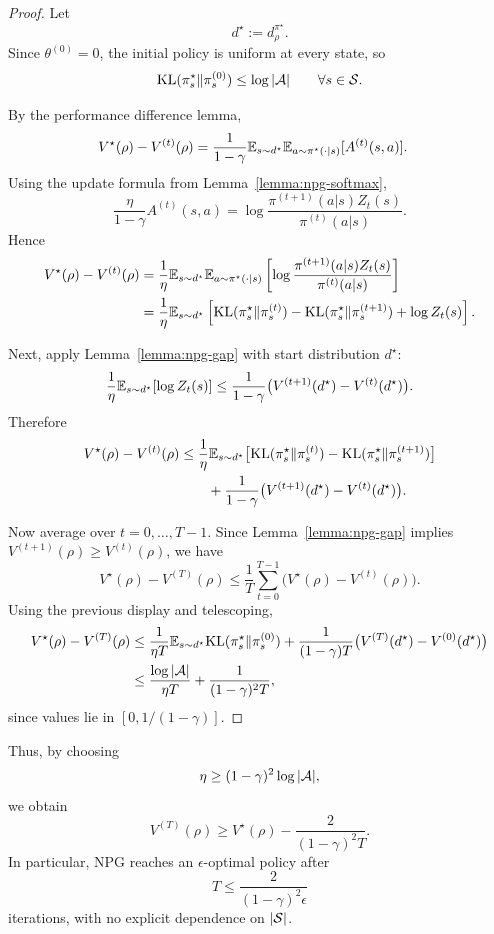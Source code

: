 \begin{proof}
Let
\[
d^\star := d_\rho^{\pi^\star}.
\]
Since $\theta^{(0)}=0$, the initial policy is uniform at every state, so
\[
\mathrm{KL}(\pi_s^\star\|\pi_s^{(0)})\le \log |\mathcal{A}|
\qquad \forall s\in\mathcal{S}.
\]

By the performance difference lemma,
\begin{align*}
V^\star(\rho)-V^{(t)}(\rho)
&=
\frac{1}{1-\gamma}
\mathbb{E}_{s\sim d^\star}
\mathbb{E}_{a\sim \pi^\star(\cdot|s)}[A^{(t)}(s,a)].
\end{align*}
Using the update formula from Lemma~\ref{lemma:npg-softmax},
\[
\frac{\eta}{1-\gamma}A^{(t)}(s,a)
=
\log \frac{\pi^{(t+1)}(a|s)Z_t(s)}{\pi^{(t)}(a|s)}.
\]
Hence
\begin{align*}
V^\star(\rho)-V^{(t)}(\rho)
&=
\frac{1}{\eta}
\mathbb{E}_{s\sim d^\star}
\mathbb{E}_{a\sim \pi^\star(\cdot|s)}
\left[
\log \frac{\pi^{(t+1)}(a|s)Z_t(s)}{\pi^{(t)}(a|s)}
\right] \\
&=
\frac{1}{\eta}
\mathbb{E}_{s\sim d^\star}
\left[
\mathrm{KL}(\pi_s^\star\|\pi_s^{(t)})
-
\mathrm{KL}(\pi_s^\star\|\pi_s^{(t+1)})
+
\log Z_t(s)
\right].
\end{align*}

Next, apply Lemma~\ref{lemma:npg-gap} with start distribution $d^\star$:
\[
\frac{1}{\eta}\mathbb{E}_{s\sim d^\star}[\log Z_t(s)]
\le
\frac{1}{1-\gamma}\big(V^{(t+1)}(d^\star)-V^{(t)}(d^\star)\big).
\]
Therefore
\begin{align*}
V^\star(\rho)-V^{(t)}(\rho)
&\le
\frac{1}{\eta}
\mathbb{E}_{s\sim d^\star}
\big[
\mathrm{KL}(\pi_s^\star\|\pi_s^{(t)})
-
\mathrm{KL}(\pi_s^\star\|\pi_s^{(t+1)})
\big] \\
&\qquad +
\frac{1}{1-\gamma}\big(V^{(t+1)}(d^\star)-V^{(t)}(d^\star)\big).
\end{align*}

Now average over $t=0,\ldots,T-1$.
Since Lemma~\ref{lemma:npg-gap} implies $V^{(t+1)}(\rho)\ge V^{(t)}(\rho)$, we have
\[
V^\star(\rho)-V^{(T)}(\rho)
\le
\frac{1}{T}\sum_{t=0}^{T-1}\big(V^\star(\rho)-V^{(t)}(\rho)\big).
\]
Using the previous display and telescoping,
\begin{align*}
V^\star(\rho)-V^{(T)}(\rho)
&\le
\frac{1}{\eta T}
\mathbb{E}_{s\sim d^\star}\mathrm{KL}(\pi_s^\star\|\pi_s^{(0)})
+
\frac{1}{(1-\gamma)T}\big(V^{(T)}(d^\star)-V^{(0)}(d^\star)\big) \\
&\le
\frac{\log |\mathcal{A}|}{\eta T} + \frac{1}{(1-\gamma)^2T},
\end{align*}
since values lie in $[0,1/(1-\gamma)]$.
\end{proof}

Thus, by choosing
\[
\eta \ge (1-\gamma)^2 \log |\mathcal{A}|,
\]
we obtain
\[
V^{(T)}(\rho)\ge V^\star(\rho)-\frac{2}{(1-\gamma)^2T}.
\]
In particular, NPG reaches an $\epsilon$-optimal policy after
\[
T \le \frac{2}{(1-\gamma)^2\epsilon}
\]
iterations, with no explicit dependence on $|\mathcal{S}|$.

